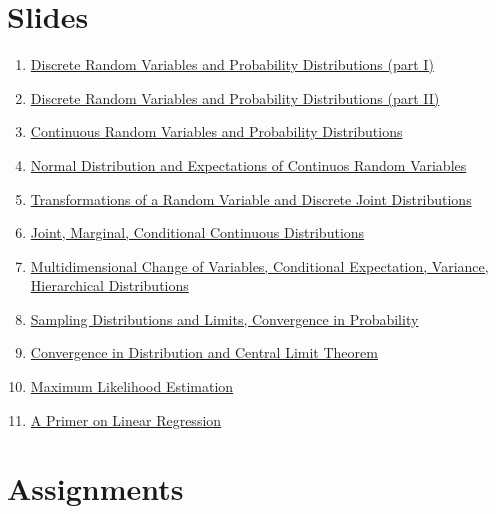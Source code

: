 \documentclass[]{book}
\providecommand{\tightlist}{%
  \setlength{\itemsep}{0pt}\setlength{\parskip}{0pt}}
\providecommand{\tightlist}{%
  \setlength{\itemsep}{0pt}\setlength{\parskip}{0pt}}
\theoremstyle{definition}
\theoremstyle{definition}
\theoremstyle{definition}
\theoremstyle{remark}
\begin{document}
\chapter*{Slides}\label{slides}

\begin{enumerate}
\def\labelenumi{\arabic{enumi}.}
\tightlist
\item
  \href{https://github.com/sahirbhatnagar/MATH697/blob/master/images/week3.pdf}{Discrete
  Random Variables and Probability Distributions (part I)}
\item
  \href{https://github.com/sahirbhatnagar/MATH697/blob/master/images/week4.pdf}{Discrete
  Random Variables and Probability Distributions (part II)}
\item
  \href{https://github.com/sahirbhatnagar/MATH697/blob/master/images/week5.pdf}{Continuous
  Random Variables and Probability Distributions}
\item
  \href{https://github.com/sahirbhatnagar/MATH697/blob/master/images/week6.pdf}{Normal
  Distribution and Expectations of Continuos Random Variables}
\item
  \href{https://github.com/sahirbhatnagar/MATH697/blob/master/images/week7.pdf}{Transformations
  of a Random Variable and Discrete Joint Distributions}
\item
  \href{https://github.com/sahirbhatnagar/MATH697/blob/master/images/week8.pdf}{Joint,
  Marginal, Conditional Continuous Distributions}
\item
  \href{https://github.com/sahirbhatnagar/MATH697/blob/master/images/week9.pdf}{Multidimensional
  Change of Variables, Conditional Expectation, Variance, Hierarchical
  Distributions}
\item
  \href{https://github.com/sahirbhatnagar/MATH697/blob/master/images/week10.pdf}{Sampling
  Distributions and Limits, Convergence in Probability}
\item
  \href{https://github.com/sahirbhatnagar/MATH697/blob/master/images/week11.pdf}{Convergence
  in Distribution and Central Limit Theorem}
\item
  \href{https://github.com/sahirbhatnagar/MATH697/blob/master/images/week12.pdf}{Maximum
  Likelihood Estimation}
\item
  \href{https://github.com/sahirbhatnagar/MATH697/blob/master/images/week13.pdf}{A
  Primer on Linear Regression}
\end{enumerate}

\chapter*{Assignments}\label{assignments}
\end{document}
